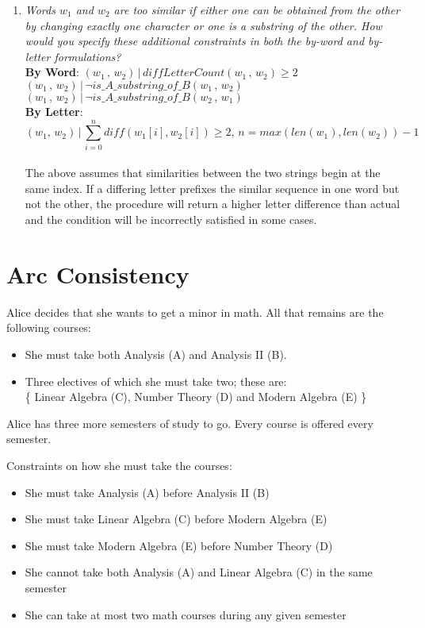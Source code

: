 \documentclass[fleqn]{hermans-hw}
\begin{document}
\begin{enumerate}
\item \textit{Words $w_{1}$ and $w_{2}$ are too similar if \emph{either} one can be
obtained from the other by changing exactly one character \emph{or}
one is a substring of the other.  %
How would you specify
these additional constraints in both the by-word and by-letter
formulations?}\\
\textbf{By Word}: $(w_{1}\, , \, w_{2}) \, | \, diffLetterCount(w_{1}\, , \, w_{2}) \geq 2$\\
$(w_{1}\, , \, w_{2}) \, | \, \neg is\_A\_substring\_of\_B(w_{1}\, , \, w_{2}) $\\
$(w_{1}\, , \, w_{2}) \, | \, \neg is\_A\_substring\_of\_B(w_{2}\, , \, w_{1}) $\\
\textbf{By Letter}: $$ (w_{1}, \, w_{2}) \, | \, \sum_{i=0}^{n}diff(w_{1}[i],w_{2}[i]) \geq 2 , \, n=max(len(w_{1}),len(w_{2}))-1$$  \\
The above assumes that similarities between the two strings begin at the same index. If a differing letter prefixes the similar sequence in one word but not the other, the procedure will return a higher letter difference than actual and the condition will be incorrectly satisfied in some cases.


\end{enumerate}

\section{Arc Consistency}

Alice decides that she wants to get a minor in math.  All that remains are the following courses:
\begin{itemize}
	\item She must take both Analysis (A) and Analysis II (B). \\ 
	\item Three electives of which she must take two; these are: \\
		\{ Linear Algebra (C), Number Theory (D) and Modern Algebra (E) \} \\
\end{itemize}
Alice has three more semesters of study to go.
Every course is offered every semester.

Constraints on how she must take the courses:
\begin{itemize}
	\item She must take Analysis (A) before Analysis II (B)
	\item She must take Linear Algebra (C) before Modern Algebra (E)
	\item She must take Modern Algebra (E) before Number Theory (D)
	\item She cannot take both Analysis (A) and Linear Algebra (C) in the same semester
	\item She can take at most two math courses during any given semester
\end{itemize}
\end{document}
